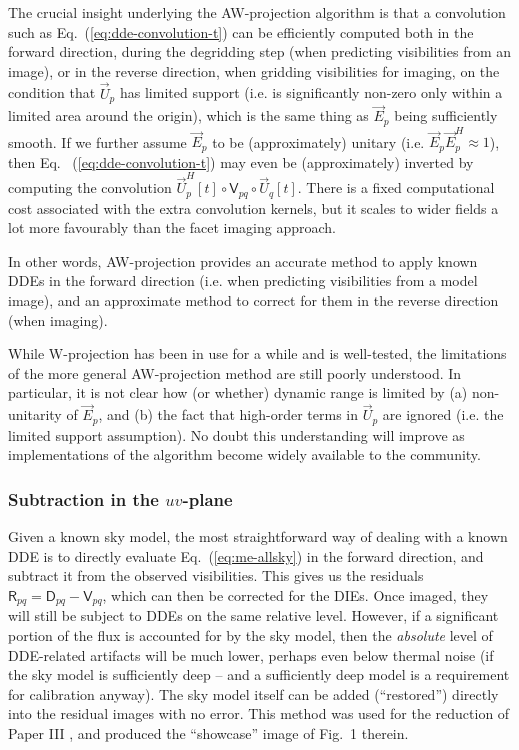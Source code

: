 \documentclass{aa}
\newcommand{\herm}{H}
\newcommand{\jones}[2]{\vec {#1}_{#2}}
\newcommand{\jonesT}[2]{\vec {#1}^{\herm}_{#2}}
\newcommand{\coh}[2]{\mathsf{{#1}}_{{#2}}}
\begin{document}
The crucial insight underlying the AW-projection algorithm is that a convolution such as Eq.~(\ref{eq:dde-convolution-t}) can be efficiently computed both in the forward direction, during the degridding step (when predicting visibilities from an image), or in the reverse direction, when gridding visibilities for imaging, on the condition that $\jones{U}{p}$ has limited support (i.e. is significantly non-zero only within a limited area around the origin), which is the same thing as $\jones{E}{p}$ being sufficiently smooth. If we further assume $\jones{E}{p}$ to be (approximately) unitary (i.e. $\jones{E}{p}\jonesT{E}{p}\approx1$), then Eq. ~(\ref{eq:dde-convolution-t}) may even be (approximately) inverted by computing the convolution $\jonesT{U}{p}[t] \circ \coh{V}{pq} \circ \jones{U}{q}[t]$. There is a fixed computational cost associated with the extra convolution kernels, but it scales to wider fields a lot more favourably than the facet imaging approach.

In other words, AW-projection provides an accurate method to apply known DDEs in the forward direction (i.e. when predicting visibilities from a model image), and an approximate method to correct for them in the reverse direction (when imaging).

While W-projection has been in use for a while and is well-tested, the limitations of the more general AW-projection method are still poorly understood. In particular, it is not clear how (or whether) dynamic range is limited by (a) non-unitarity of $\jones{E}{p}$, and (b) the fact that high-order terms in $\jones{U}{p}$ are ignored (i.e. the limited support assumption). No doubt this understanding will improve as implementations of the algorithm become widely available to the community.

\subsubsection{Subtraction in the $uv$-plane\label{sec:subtraction-uv-plane}}

Given a known sky model, the most straightforward way of dealing with a known DDE is to directly evaluate Eq.~(\ref{eq:me-allsky}) in the forward direction, and subtract it from the observed visibilities. This gives us the residuals $\coh{R}{pq} = \coh{D}{pq} - \coh{V}{pq}$, which can then be corrected for the DIEs. Once imaged, they will still be subject to DDEs on the same relative level. However, if a significant portion of the flux is accounted for by the sky model, then the \emph{absolute} level of DDE-related artifacts will be much lower, perhaps even below thermal noise (if the sky model is sufficiently deep -- and a sufficiently deep model is a requirement for calibration anyway). The sky model itself can be added (``restored'') directly into the residual images with no error. This method was used for the reduction of Paper III \citep{RRIME3}, and produced the ``showcase'' image of Fig.~1 therein.
\end{document}
